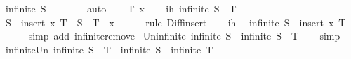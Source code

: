 \begin{isabellebody}
\ {\isachardoublequoteopen}infinite\ {\isacharparenleft}{\kern0pt}S\ {\isacharminus}{\kern0pt}\ {\isacharbraceleft}{\kern0pt}{\isacharbraceright}{\kern0pt}{\isacharparenright}{\kern0pt}{\isachardoublequoteclose}\isanewline
\ \ \ \ \isamarkupfalse%
\ auto\isanewline
{}\isamarkupfalse%
\isanewline
\ \ \isamarkupfalse%
\ T\ x\isanewline
\ \ \isamarkupfalse%
\ ih{\isacharcolon}{\kern0pt}\ {\isachardoublequoteopen}infinite\ {\isacharparenleft}{\kern0pt}S\ {\isacharminus}{\kern0pt}\ T{\isacharparenright}{\kern0pt}{\isachardoublequoteclose}\isanewline
\ \ \isamarkupfalse%
\ {\isachardoublequoteopen}S\ {\isacharminus}{\kern0pt}\ {\isacharparenleft}{\kern0pt}insert\ x\ T{\isacharparenright}{\kern0pt}\ {\isacharequal}{\kern0pt}\ {\isacharparenleft}{\kern0pt}S\ {\isacharminus}{\kern0pt}\ T{\isacharparenright}{\kern0pt}\ {\isacharminus}{\kern0pt}\ {\isacharbraceleft}{\kern0pt}x{\isacharbraceright}{\kern0pt}{\isachardoublequoteclose}\isanewline
\ \ \ \ \isamarkupfalse%
\ {\isacharparenleft}{\kern0pt}rule\ Diff{\isacharunderscore}{\kern0pt}insert{\isacharparenright}{\kern0pt}\isanewline
\ \ \isamarkupfalse%
\ ih\ \isamarkupfalse%
\ {\isachardoublequoteopen}infinite\ {\isacharparenleft}{\kern0pt}S\ {\isacharminus}{\kern0pt}\ {\isacharparenleft}{\kern0pt}insert\ x\ T{\isacharparenright}{\kern0pt}{\isacharparenright}{\kern0pt}{\isachardoublequoteclose}\isanewline
\ \ \ \ \isamarkupfalse%
\ {\isacharparenleft}{\kern0pt}simp\ add{\isacharcolon}{\kern0pt}\ infinite{\isacharunderscore}{\kern0pt}remove{\isacharparenright}{\kern0pt}\isanewline
{}\isamarkupfalse%
%
\endisatagproof
{\isafoldproof}%
%
\isadelimproof
\isanewline
%
\endisadelimproof
\isanewline
{}\isamarkupfalse%
\ Un{\isacharunderscore}{\kern0pt}infinite{\isacharcolon}{\kern0pt}\ {\isachardoublequoteopen}infinite\ S\ {\isasymLongrightarrow}\ infinite\ {\isacharparenleft}{\kern0pt}S\ {\isasymunion}\ T{\isacharparenright}{\kern0pt}{\isachardoublequoteclose}\isanewline
%
\isadelimproof
\ \ %
\endisadelimproof
%
\isatagproof
{}\isamarkupfalse%
\ simp%
\endisatagproof
{\isafoldproof}%
%
\isadelimproof
\isanewline
%
\endisadelimproof
\isanewline
{}\isamarkupfalse%
\ infinite{\isacharunderscore}{\kern0pt}Un{\isacharcolon}{\kern0pt}\ {\isachardoublequoteopen}infinite\ {\isacharparenleft}{\kern0pt}S\ {\isasymunion}\ T{\isacharparenright}{\kern0pt}\ {\isasymlongleftrightarrow}\ infinite\ S\ {\isasymor}\ infinite\ T{\isachardoublequoteclose}\isanewline

\end{isabellebody}
